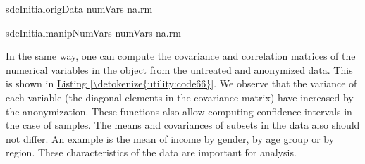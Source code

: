 \documentclass[letterpaper,10pt,english]{sphinxmanual}
\begin{document}
\def\sphinxLiteralBlockLabel{\label{\detokenize{utility:code65}}}
%
\begin{sphinxVerbatim}[commandchars=\\\{\},numbers=left,firstnumber=1,stepnumber=1]
sdcInitialorigData\PYG{p}{[} numVars\PYG{p}{]} na.rm  

sdcInitialmanipNumVars\PYG{p}{[} numVars\PYG{p}{]} na.rm  
\end{sphinxVerbatim}

In the same way, one can compute the covariance and correlation matrices
of the numerical variables in the  object from the untreated
and anonymized data. This is shown in \hyperref[\detokenize{utility:code66}]{Listing \ref{\detokenize{utility:code66}}}. We observe that the
variance of each variable (the diagonal elements in the covariance
matrix) have increased by the anonymization. These functions also allow
computing confidence intervals in the case of samples. The means and
covariances of subsets in the data also should not differ. An example is
the mean of income by gender, by age group or by region. These
characteristics of the data are important for analysis.
\end{document}
